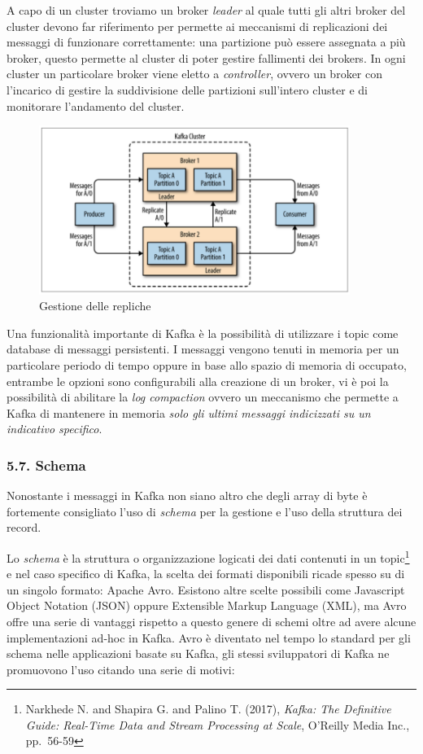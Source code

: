 \documentclass[]{article}
\begin{document}
A capo di un cluster troviamo un broker \emph{leader} al quale tutti gli
altri broker del cluster devono far riferimento per permette ai
meccanismi di replicazioni dei messaggi di funzionare correttamente: una
partizione può essere assegnata a più broker, questo permette al cluster
di poter gestire fallimenti dei brokers. In ogni cluster un particolare
broker viene eletto a \emph{controller}, ovvero un broker con l'incarico
di gestire la suddivisione delle partizioni sull'intero cluster e di
monitorare l'andamento del cluster.

\begin{figure}
\centering
\includegraphics[width=0.90000\textwidth]{../images/partition-replica.png}
\caption{Gestione delle repliche \label{figure_5}}
\end{figure}

Una funzionalità importante di Kafka è la possibilità di utilizzare i
topic come database di messaggi persistenti. I messaggi vengono tenuti
in memoria per un particolare periodo di tempo oppure in base allo
spazio di memoria di occupato, entrambe le opzioni sono configurabili
alla creazione di un broker, vi è poi la possibilità di abilitare la
\emph{log compaction} ovvero un meccanismo che permette a Kafka di
mantenere in memoria \emph{solo gli ultimi messaggi indicizzati su un
indicativo specifico}.

\newpage

\subsubsection{5.7. Schema}\label{schema}

Nonostante i messaggi in Kafka non siano altro che degli array di byte è
fortemente consigliato l'uso di \emph{schema} per la gestione e l'uso
della struttura dei record.

Lo \emph{schema} è la struttura o organizzazione logicati dei dati
contenuti in un topic\footnote{Narkhede N. and Shapira G. and Palino T.
  (2017), \emph{Kafka: The Definitive Guide: Real-Time Data and Stream
  Processing at Scale}, O'Reilly Media Inc., pp.~56-59} e nel caso
specifico di Kafka, la scelta dei formati disponibili ricade spesso su
di un singolo formato: Apache Avro. Esistono altre scelte possibili come
Javascript Object Notation (JSON) oppure Extensible Markup Language
(XML), ma Avro offre una serie di vantaggi rispetto a questo genere di
schemi oltre ad avere alcune implementazioni ad-hoc in Kafka. Avro è
diventato nel tempo lo standard per gli schema nelle applicazioni basate
su Kafka, gli stessi sviluppatori di Kafka ne promuovono l'uso citando
una serie di motivi:
\end{document}
